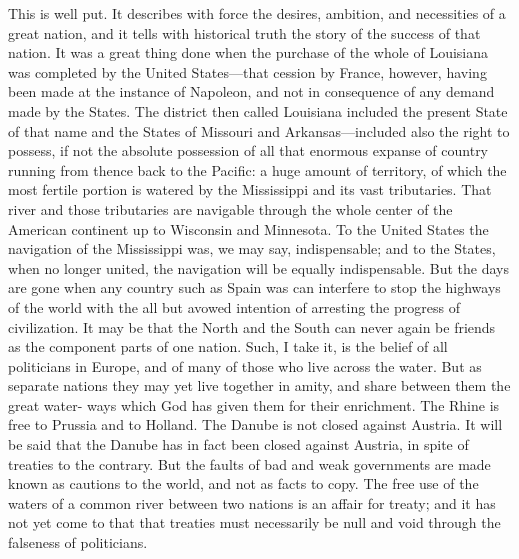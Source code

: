 This is well put.  It describes with force the desires, ambition,
and necessities of a great nation, and it tells with historical
truth the story of the success of that nation.  It was a great
thing done when the purchase of the whole of Louisiana was
completed by the United States---that cession by France, however,
having been made at the instance of Napoleon, and not in
consequence of any demand made by the States.  The district then
called Louisiana included the present State of that name and the
States of Missouri and Arkansas---included also the right to
possess, if not the absolute possession of all that enormous
expanse of country running from thence back to the Pacific: a huge
amount of territory, of which the most fertile portion is watered
by the Mississippi and its vast tributaries.  That river and those
tributaries are navigable through the whole center of the American
continent up to Wisconsin and Minnesota.  To the United States the
navigation of the Mississippi was, we may say, indispensable; and
to the States, when no longer united, the navigation will be
equally indispensable.  But the days are gone when any country such
as Spain was can interfere to stop the highways of the world with
the all but avowed intention of arresting the progress of
civilization.  It may be that the North and the South can never
again be friends as the component parts of one nation.  Such, I
take it, is the belief of all politicians in Europe, and of many of
those who live across the water.  But as separate nations they may
yet live together in amity, and share between them the great water-
ways which God has given them for their enrichment.  The Rhine is
free to Prussia and to Holland.  The Danube is not closed against
Austria.  It will be said that the Danube has in fact been closed
against Austria, in spite of treaties to the contrary.  But the
faults of bad and weak governments are made known as cautions to
the world, and not as facts to copy.  The free use of the waters of
a common river between two nations is an affair for treaty; and it
has not yet come to that that treaties must necessarily be null and
void through the falseness of politicians.

